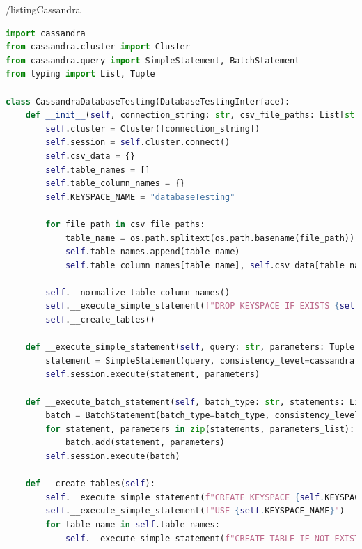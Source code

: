 /listing{Cassandra}
\begin{lstlisting}[language=Python, caption=CassandraDatabaseTesting]
import cassandra
from cassandra.cluster import Cluster
from cassandra.query import SimpleStatement, BatchStatement
from typing import List, Tuple

class CassandraDatabaseTesting(DatabaseTestingInterface):
    def __init__(self, connection_string: str, csv_file_paths: List[str]):
        self.cluster = Cluster([connection_string])
        self.session = self.cluster.connect()
        self.csv_data = {}
        self.table_names = []
        self.table_column_names = {}
        self.KEYSPACE_NAME = "databaseTesting"

        for file_path in csv_file_paths:
            table_name = os.path.splitext(os.path.basename(file_path))[0]
            self.table_names.append(table_name)
            self.table_column_names[table_name], self.csv_data[table_name] = self.__parse_csv_data(file_path)

        self.__normalize_table_column_names()
        self.__execute_simple_statement(f"DROP KEYSPACE IF EXISTS {self.KEYSPACE_NAME}")
        self.__create_tables()

    def __execute_simple_statement(self, query: str, parameters: Tuple = ()):
        statement = SimpleStatement(query, consistency_level=cassandra.ConsistencyLevel.ONE)
        self.session.execute(statement, parameters)

    def __execute_batch_statement(self, batch_type: str, statements: List[str], parameters_list: List[Tuple[Tuple]]):
        batch = BatchStatement(batch_type=batch_type, consistency_level=cassandra.ConsistencyLevel.ONE)
        for statement, parameters in zip(statements, parameters_list):
            batch.add(statement, parameters)
        self.session.execute(batch)

    def __create_tables(self):
        self.__execute_simple_statement(f"CREATE KEYSPACE {self.KEYSPACE_NAME} WITH REPLICATION = {{'class': 'SimpleStrategy', 'replication_factor': 1}}")
        self.__execute_simple_statement(f"USE {self.KEYSPACE_NAME}")
        for table_name in self.table_names:
            self.__execute_simple_statement(f"CREATE TABLE IF NOT EXISTS {table_name} ({self.table_column_names[table_name][0]} timestamp, {self.table_column_names[table_name][1]} timestamp, {self.table_column_names[table_name][2]} float, {self.table_column_names[table_name][3]} int, PRIMARY KEY ({self.table_column_names[table_name][0]}, {self.table_column_names[table_name][1]}))")


\end{lstlisting}
